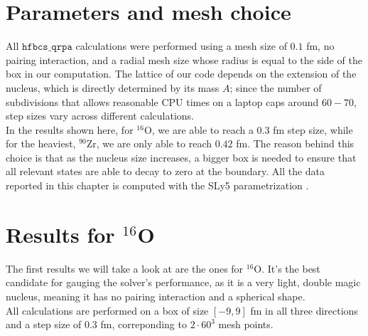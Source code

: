 \section{Parameters and mesh choice}
All $\texttt{hfbcs\_qrpa}$ calculations were performed using a mesh size of $0.1$ fm, no pairing interaction, and a radial mesh size whose radius is equal to the side of the box in our computation. The lattice of our code depends on the extension of the nucleus, which is directly determined by its mass $A$; since the number of subdivisions that allows reasonable CPU times on a laptop caps around $60-70$, step sizes vary across different calculations. 
\\In the results shown here, for $^{16}$O, we are able to reach a $0.3$ fm step size, while for the heaviest, $^{90}$Zr, we are only able to reach $0.42$ fm. The reason behind this choice is that as the nucleus size increases, a bigger box is needed to ensure that all relevant states are able to decay to zero at the boundary. All the data reported in this chapter is computed with the SLy5 parametrization \cite{chabanat2}.
\section{Results for \(^{16}\)O}
The first results we will take a look at are the ones for $^{16}$O. It's the best candidate for gauging the solver's performance, as it is a very light, double magic nucleus, meaning it has no pairing interaction and a spherical shape.
\\All calculations are performed on a box of size $[-9, 9]$ fm in all three directions and a step size of $0.3$ fm, correponding to $2\cdot 60^{3}$ mesh points.
